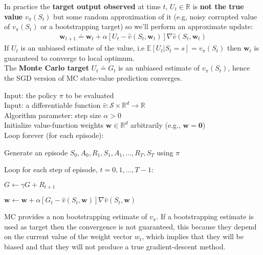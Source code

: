 In practice the \textbf{target output observed} at time $t$, $U_t\in\mathbb{R}$ is \textbf{not the true value} $v_\pi(S_t)$ but some random approximation of it (e.g, noisy corrupted value of $v_\pi(S_t)$ or a bootstrapping target) so we'll perform an approximate update:
\begin{align}
    \mathbf{w}_{t+1}\doteq\mathbf{w}_{t}+\alpha[U_t-\hat{v}(S_t, \mathbf{w}_{t})]\nabla \hat{v}(S_t, \mathbf{w}_{t})
\end{align}
If $U_t$ is an unbiased estimate of the value, i.e $\mathbb{E}[U_t|S_t=s]=v_\pi(S_t)$ then $\mathbf{w}_t$ is guaranteed to converge to local optimum.\\

The \textbf{Monte Carlo target} $U_t\doteq G_t$ is an unbiased estimate of $v_\pi(S_t)$, hence the SGD version of MC state-value prediction converges.\\

\begin{tcolorbox}[colback=black!7!white,colframe=black!75!white,title=\textbf{Gradient Monte Carlo Algorithm for Estimating} $\mathbf{\hat{v}\approx v_\pi}$]
Input: the policy $\pi$ to be evaluated\\
Input: a differentiable function $\hat{v}: \mathcal{S}\times\mathbb{R}^d\rightarrow\mathbb{R}$\\
Algorithm parameter: step size $\alpha > 0$\\
Initialize value-function weights $\mathbf{w}\in\mathbb{R}^d$ arbitrarily (e.g., $\mathbf{w=0}$)\\

Loop forever (for each episode):

    \qquad Generate an episode $S_0, A_0, R_1, S_1, A_1,\dots,R_T,S_T$ using $\pi$

    \qquad Loop for each step of episode, $t=0,1,\dots, T-1$:

    \qquad\qquad $G\leftarrow \gamma G+R_{t+1}$

    \qquad\qquad $\mathbf{w}\leftarrow\mathbf{w}+\alpha[G_t-\hat{v}(S_t, \mathbf{w})]\nabla \hat{v}(S_t, \mathbf{w})$
\end{tcolorbox}

MC provides a non bootstrapping estimate of $v_\pi$. If a bootstrapping estimate is used as target then the convergence is not guaranteed, this because they depend on the current value of the
weight vector $w_t$, which implies that they will be biased and that they will not produce a true gradient-descent method.\\

